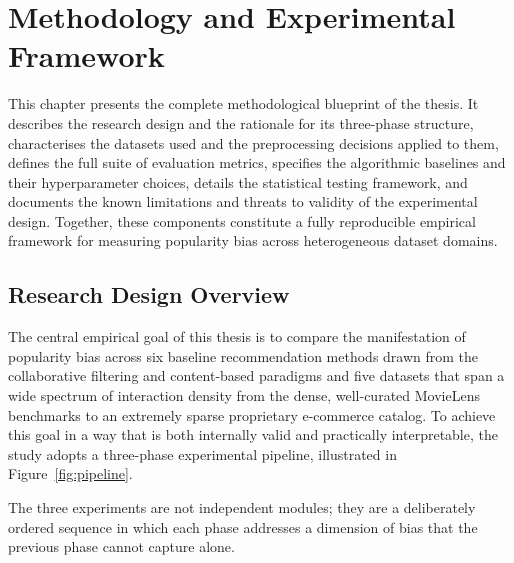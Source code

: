 \documentclass[11pt,a4paper]{report}
\begin{document}
\chapter{Methodology and Experimental Framework}
\label{ch:methodology}

This chapter presents the complete methodological blueprint of the thesis. It describes the research design and the rationale for its three-phase structure, characterises the datasets used and the preprocessing decisions applied to them, defines the full suite of evaluation metrics, specifies the algorithmic baselines and their hyperparameter choices, details the statistical testing framework, and documents the known limitations and threats to validity of the experimental design. Together, these components constitute a fully reproducible empirical framework for measuring popularity bias across heterogeneous dataset domains.

\section{Research Design Overview}
\label{sec:method_design}

The central empirical goal of this thesis is to compare the manifestation of popularity bias across six baseline recommendation methods drawn from the collaborative filtering and content-based paradigms and five datasets that span a wide spectrum of interaction density from the dense, well-curated MovieLens benchmarks to an extremely sparse proprietary e-commerce catalog. To achieve this goal in a way that is both internally valid and practically interpretable, the study adopts a three-phase experimental pipeline, illustrated in Figure~\ref{fig:pipeline}.

The three experiments are not independent modules; they are a deliberately ordered sequence in which each phase addresses a dimension of bias that the previous phase cannot capture alone.
\end{document}
